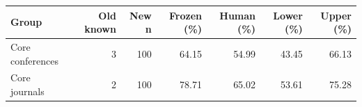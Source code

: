 \begin{tabular}{@{}lrrrrrr@{}}
\toprule
Group & Old known & New n & Frozen (\%) & Human (\%) & Lower (\%) & Upper (\%) \\
\midrule
Core conferences & 3 & 100 & 64.15 & 54.99 & 43.45 & 66.13 \\
Core journals & 2 & 100 & 78.71 & 65.02 & 53.61 & 75.28 \\
\bottomrule
\end{tabular}
